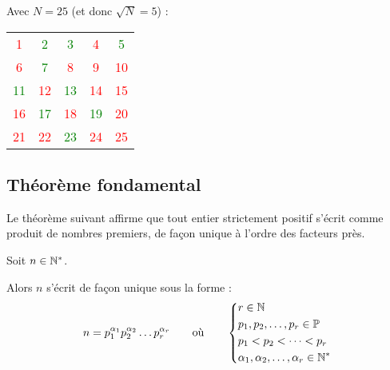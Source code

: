 \begin{ex}
Avec \(N=25\) (et donc \(\sqrt{N}=5\)) :

\begin{center}
\begin{tabular}{ccccc}
\textcolor{red}{1} & \textcolor{green}{2} & \textcolor{green}{3} & \textcolor{red}{4} & \textcolor{green}{5} \\
\textcolor{red}{6} & \textcolor{green}{7} & \textcolor{red}{8} & \textcolor{red}{9} & \textcolor{red}{10} \\
\textcolor{green}{11} & \textcolor{red}{12} & \textcolor{green}{13} & \textcolor{red}{14} & \textcolor{red}{15} \\
\textcolor{red}{16} & \textcolor{green}{17} & \textcolor{red}{18} & \textcolor{green}{19} & \textcolor{red}{20} \\
\textcolor{red}{21} & \textcolor{red}{22} & \textcolor{green}{23} & \textcolor{red}{24} & \textcolor{red}{25}
\end{tabular}
\end{center}
\end{ex}

\subsection{Théorème fondamental}

Le théorème suivant affirme que tout entier strictement positif s'écrit comme produit de nombres premiers, de façon unique à l'ordre des facteurs près.

\begin{theo}
Soit \(n\in\mathbb{N}^*\).

Alors \(n\) s'écrit de façon unique sous la forme : \[n=p_1^{\alpha_1}p_2^{\alpha_2}\dots p_r^{\alpha_r}\qquad\text{où}\qquad\begin{dcases}r\in\mathbb{N} \\ p_1,p_2,\dots,p_r\in\mathbb{P} \\ p_1<p_2<\dots<p_r \\ \alpha_1,\alpha_2,\dots,\alpha_r\in\mathbb{N}^*\end{dcases}\]
\end{theo}

